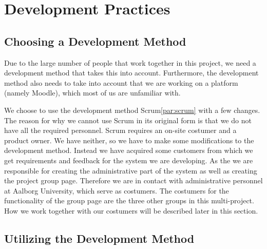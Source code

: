 \section{Development Practices} %

\subsection{Choosing a Development Method}
Due to the large number of people that work together in this project, we need a development method that takes this into account.
Furthermore, the development method also needs to take into account that we are working on a platform (namely Moodle), which most of us are unfamiliar with.

We choose to use the development method Scrum\ref{par:scrum} with a few changes.
The reason for why we cannot use Scrum in its original form is that we do not have all the required personnel. 
Scrum requires an on-site costumer and a product owner.
We have neither, so we have to make some modifications to the development method.
Instead we have acquired some customers from which we get requirements and feedback for the system we are developing.
As the \groupname{} we are responsible for creating the administrative part of the system as well as creating the project group page.
Therefore we are in contact with administrative personnel at Aalborg University, which serve as costumers.
The costumers for the functionality of the group page are the three other groups in this multi-project.
How we work together with our costumers will be described later in this section.

\subsection{Utilizing the Development Method}











